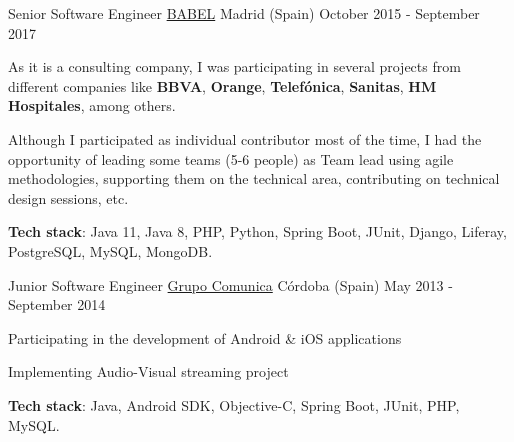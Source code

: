 \begin{cventries}
  \cventry
    {Senior Software Engineer} %
    {\href{https://babel.es/en}{BABEL}} %
    {Madrid (Spain)} %
    {October 2015 - September 2017} %
    {
      \begin{cvitems}%
        \item[] As it is a consulting company, I was participating in several projects from different companies like \textbf{BBVA}, \textbf{Orange}, \textbf{Telefónica}, \textbf{Sanitas}, \textbf{HM Hospitales}, among others.
        \item[]
        \item[] Although I participated as individual contributor most of the time, I had the opportunity of leading some teams (5-6 people) as Team lead using agile methodologies, supporting them on the technical area, contributing on technical design sessions, etc.
        \item[] 
        \item[]\textbf{Tech stack}: Java 11, Java 8, PHP, Python, Spring Boot, JUnit, Django, Liferay, PostgreSQL, MySQL, MongoDB.
      \end{cvitems}
    }
    

  \cventry
    {Junior Software Engineer} %
    {\href{http://www.grupocomunica.com/}{Grupo Comunica}} %
    {Córdoba (Spain)} %
    {May 2013 - September 2014} %
    {
      \begin{cvitems}%
        \item {Participating in the development of Android \& iOS applications}
        \item {Implementing Audio-Visual streaming project}
        \item[] 
        \item[]\textbf{Tech stack}: Java, Android SDK, Objective-C, Spring Boot, JUnit, PHP, MySQL.
      \end{cvitems}
    }

\end{cventries}
